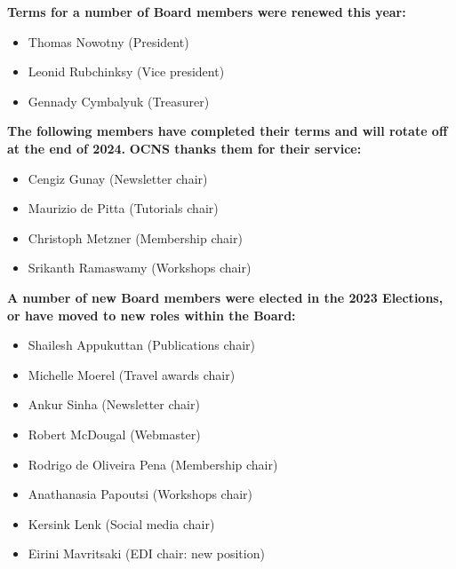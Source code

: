 \documentclass[11pt,a4paper,oneside]{article}
\begin{document}
\textbf{Terms for a number of Board members were renewed this year:}
\begin{multicols}{2}
  \begin{itemize}
    \item Thomas Nowotny (President)
    \item Leonid Rubchinksy (Vice president)
    \item Gennady Cymbalyuk (Treasurer)
  \end{itemize}
\end{multicols}

\textbf{The following members have completed their terms and will rotate off at the end of 2024.}
\textbf{OCNS thanks them for their service:}
\begin{multicols}{2}
  \begin{itemize}
    \item Cengiz Gunay (Newsletter chair)
    \item Maurizio de Pitta (Tutorials chair)
    \item Christoph Metzner (Membership chair)
    \item Srikanth Ramaswamy (Workshops chair)
  \end{itemize}
\end{multicols}

\textbf{A number of new Board members were elected in the 2023 Elections, or have moved to new roles within the Board:}
\begin{multicols}{2}
  \begin{itemize}
    \item Shailesh Appukuttan (Publications chair)
    \item Michelle Moerel (Travel awards chair)
    \item Ankur Sinha (Newsletter chair)
    \item Robert McDougal (Webmaster)
    \item Rodrigo de Oliveira Pena (Membership chair)
    \item Anathanasia Papoutsi (Workshops chair)
    \item Kersink Lenk (Social media chair)
    \item Eirini Mavritsaki (EDI chair: new position)
  \end{itemize}
\end{multicols}
\end{document}

